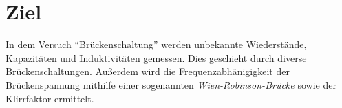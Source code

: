 \section{Ziel}
\label{sec:Ziel}

In dem Versuch \enquote{Brückenschaltung} werden unbekannte Wiederstände, Kapazitäten und Induktivitäten
gemessen. Dies geschieht durch diverse Brückenschaltungen. Außerdem wird die Frequenzabhänigigkeit der Brückenspannung
mithilfe einer sogenannten \textit{Wien-Robinson-Brücke} sowie der Klirrfaktor ermittelt.